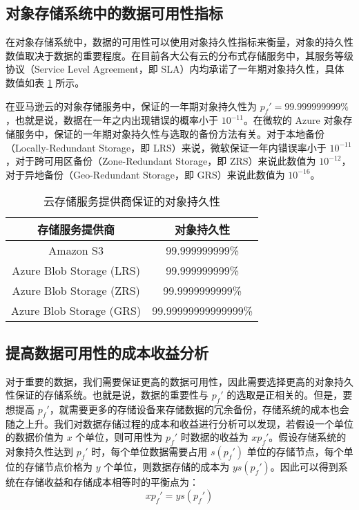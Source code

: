 \subsection{对象存储系统中的数据可用性指标}
在对象存储系统中，数据的可用性可以使用对象持久性指标来衡量，对象的持久性数值取决于数据的重要程度。在目前各大公有云的分布式存储服务中，其服务等级协议（Service Level Agreement，即 SLA）内均承诺了一年期对象持久性，具体数值如表 \ref{t1} 所示。

在亚马逊云的对象存储服务中，保证的一年期对象持久性为 $p_{f}'=99.999999999\%$，也就是说，数据在一年之内出现错误的概率小于 $10^{-11}$。在微软的 Azure 对象存储服务\cite{huang2012erasure}中，保证的一年期对象持久性与选取的备份方法有关。对于本地备份（Locally-Redundant Storage，即 LRS）来说，微软保证一年内错误率小于 $10^{-11}$，对于跨可用区备份（Zone-Redundant Storage，即 ZRS）来说此数值为 $10^{-12}$，对于异地备份（Geo-Redundant Storage，即 GRS）来说此数值为 $10^{-16}$。

\begin{table}[!htb]
\centering
\caption{云存储服务提供商保证的对象持久性}
\begin{tabular}{c|c}
\hline
存储服务提供商 & 对象持久性\\\hline
Amazon S3\cite{amazon2020amazon} & 99.999999999\%\\\hline
Azure Blob Storage (LRS)\cite{microsoft2020azure} & 99.999999999\%\\\hline
Azure Blob Storage (ZRS)\cite{microsoft2020azure} & 99.9999999999\%\\\hline
Azure Blob Storage (GRS)\cite{microsoft2020azure} & 99.99999999999999\%\\\hline
\end{tabular}
\label{t1}
\end{table}
\subsection{提高数据可用性的成本收益分析}
对于重要的数据，我们需要保证更高的数据可用性，因此需要选择更高的对象持久性保证的存储系统。也就是说，数据的重要性与 $p_{f}'$ 的选取是正相关的。但是，要想提高 $p_{f}'$，就需要更多的存储设备来存储数据的冗余备份，存储系统的成本也会随之上升。我们对数据存储过程的成本和收益进行分析可以发现，若假设一个单位的数据价值为 $x$ 个单位，则可用性为 $p_{f}'$ 时数据的收益为 $xp_{f}'$。假设存储系统的对象持久性达到 $p_{f}'$ 时，每个单位数据需要占用 $s(p_{f}')$ 单位的存储节点，每个单位的存储节点价格为 $y$ 个单位，则数据存储的成本为 $ys(p_{f}')$。因此可以得到系统在存储收益和存储成本相等时的平衡点为：
$$
xp_{f}'=ys(p_{f}')
$$

